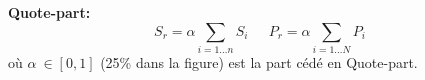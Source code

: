 \begin{f}
\textbf{Quote-part:}
\[
S_r=\alpha \sum_{i=1\ldots n}S_i\quad \ \ P_r=\alpha\sum_{i=1\ldots N}P_i 
\]
où \(\alpha\ \in [0,1]\) (25\% dans la figure) est la part cédé en  Quote-part.
	

	

\end{f}
